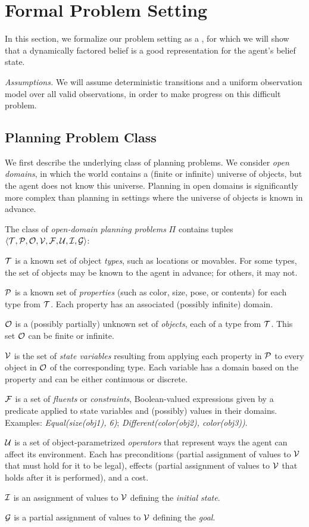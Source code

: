 \section{Formal Problem Setting}
In this section, we formalize our problem setting as a \pomdp, for
which we will show that a dynamically factored belief is a good
representation for the agent's belief state.

\emph{Assumptions.} We will assume deterministic transitions and a uniform
observation model over all valid observations, in order to make
progress on this difficult problem.

\subsection{Planning Problem Class}
We first describe the underlying class of planning problems. We
consider \emph{open domains}, in which the world contains a
(finite or infinite) universe of objects, but the agent does not know this
universe. Planning in open domains is significantly more complex than
planning in settings where the universe of objects is known in
advance.

The class of \emph{open-domain planning problems} $\Pi$ contains tuples
$\langle \T, \P, \Obj, \V, \F, \U, \I, \G \rangle$:
\begin{tightlist}
\item $\T$ is a known set of object \emph{types}, such as locations or
  movables. For some types, the set of objects may be
  known to the agent in advance; for others, it may not.
\item $\P$ is a known set of \emph{properties} (such as color,
  size, pose, or contents) for each type from $\T$. Each property has
  an associated (possibly infinite) domain.
\item $\Obj$ is a (possibly partially) unknown set of \emph{objects},
  each of a type from $\T$. This set $\Obj$ can be finite or infinite.
\item $\V$ is the set of \emph{state variables} resulting from
  applying each property in $\P$ to every object in $\Obj$ of the
  corresponding type. Each variable has a domain based on the
  property and can be either continuous or discrete.
\item $\F$ is a set of \emph{fluents} or \emph{constraints},
  Boolean-valued expressions given by a predicate applied to state
  variables and (possibly) values in their domains. Examples:
  \emph{Equal(size(obj1), 6)}; \emph{Different(color(obj2),
    color(obj3))}.
\item $\U$ is a set of object-parametrized \emph{operators} that
  represent ways the agent can affect its environment. Each has
  preconditions (partial assignment of values to $\V$ that must hold for
  it to be legal), effects (partial assignment of values to $\V$ that
  holds after it is performed), and a cost.
\item $\I$ is an assignment of values to $\V$ defining the \emph{initial state}.
\item $\G$ is a partial assignment of values to $\V$ defining the \emph{goal}.
\end{tightlist}

